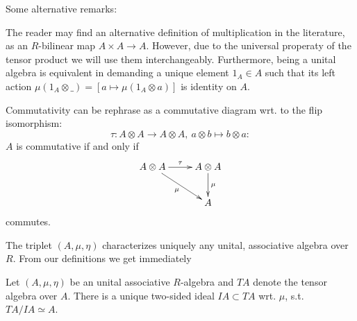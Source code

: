 \bmk \label{alg_general} Some alternative remarks:\\
\bn
\item The reader may find an alternative definition of multiplication in the literature, as an $R$-bilinear map $A \times A \longrightarrow A$. However, due to the universal properaty of the tensor product we will use them interchangeably. Furthermore, being a unital algebra is equivalent in demanding a unique element $1_A \in A$ such that its left action $\mu(1_A \otimes \_) = [a \longmapsto \mu(1_A \otimes a)]$ is identity on $A$.%
\item Commutativity can be rephrase as a commutative diagram wrt. to the flip isomorphism:
$$\tau : A \otimes A \longrightarrow A\otimes A,\ a \otimes b \longmapsto b \otimes a:$$
$A$ is commutative if and only if
$$\xymatrix{
A \otimes A \ar[r]^\tau \ar[rd]_{\mu} & A \otimes A \ar[d]^\mu\\
&A\\
}$$
commutes.
\item The triplet $(A,\mu,\eta)$ characterizes uniquely any unital, associative algebra over $R$.
\en
From our definitions we get immediately
\begin{prop}\label{prop01}
Let $(A,\mu,\eta)$ be an unital associative $R$-algebra and $T A$ denote the tensor algebra over $A$. There is a unique two-sided ideal $I A \subset T A$ wrt. $\mu$, s.t. $T A /I A \simeq A$.%
\end{prop}
